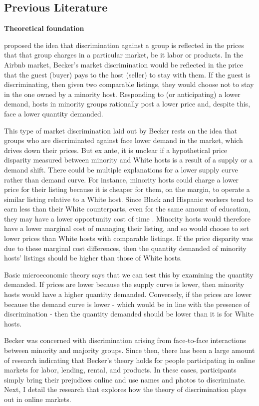 \subsection{Previous Literature} 
\label{previous}

\textbf{Theoretical foundation}

\cite{becker} proposed the idea that discrimination against a group is reflected in the prices that that group charges in a particular market, be it labor or products. In the Airbnb market, Becker's market discrimination would be reflected in the price that the guest (buyer) pays to the host (seller) to stay with them. If the guest is discriminating, then given two comparable listings, they would choose not to stay in the one owned by a minority host. Responding to (or anticipating) a lower demand, hosts in minority groups rationally post a lower price and, despite this, face a lower quantity demanded. 

This type of market discrimination laid out by Becker rests on the idea that groups who are discriminated against face lower demand in the market, which drives down their prices. But ex ante, it is unclear if a hypothetical price disparity measured between minority and White hosts is a result of a supply or a demand shift. There could be multiple explanations for a lower supply curve rather than demand curve. For instance, minority hosts could charge a lower price for their listing because it is cheaper for them, on the margin, to operate a similar listing relative to a White host. Since Black and Hispanic workers tend to earn less than their White counterparts, even for the same amount of education, they may have a lower opportunity cost of time \citep{wages}. Minority hosts would therefore have a lower marginal cost of managing their listing, and so would choose to set lower prices than White hosts with comparable listings. If the price disparity was due to these marginal cost differences, then the quantity demanded of minority hosts' listings should be higher than those of White hosts. 

Basic microeconomic theory says that we can test this by examining the quantity demanded. If prices are lower because the supply curve is lower, then minority hosts would have a higher quantity demanded. Conversely, if the prices are lower because the demand curve is lower - which would be in line with the presence of discrimination - then the quantity demanded should be lower than it is for White hosts. 

Becker was concerned with discrimination arising from face-to-face interactions between minority and majority groups. Since then, there has been a large amount of research indicating that Becker's theory holds for people participating in online markets for labor, lending, rental, and products. In these cases, participants simply bring their prejudices online and use names and photos to discriminate. Next, I detail the research that explores how the theory of discrimination plays out in online markets. 


